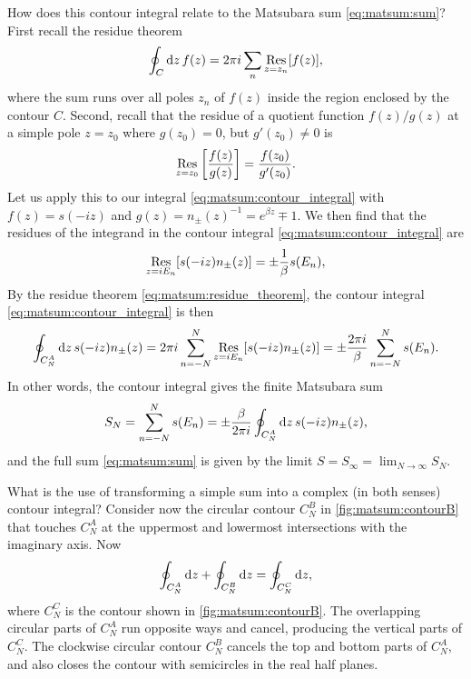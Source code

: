 How does this contour integral relate to the Matsubara sum \eqref{eq:matsum:sum}?
First recall the residue theorem
\begin{equation}
	\oint_C \mathop{}\!\mathrm{d} z \, f(z) = 2 \pi i \sum_n \operatorname*{Res}_{z=z_n} [f(z)] ,
\label{eq:matsum:residue_theorem}
\end{equation}
where the sum runs over all poles $z_n$ of $f(z)$ inside the region enclosed by the contour $C$.
Second, recall that the residue of a quotient function $f(z) / g(z)$ at a simple pole $z = z_0$ where $g(z_0) = 0$, but $g'(z_0) \neq 0$ is 
\begin{equation}
	\operatorname*{Res}_{z=z_0} \left[ \frac{f(z)}{g(z)} \right] = \frac{f(z_0)}{g'(z_0)} .
\label{eq:matsum:residue_quotient}
\end{equation}
Let us apply this to our integral \eqref{eq:matsum:contour_integral} with $f(z) = s(-iz)$ and $g(z) = n_\pm(z)^{-1} = e^{\beta z} \mp 1$.
We then find that the residues of the integrand in the contour integral \eqref{eq:matsum:contour_integral} are
\begin{equation}
	\operatorname*{Res}_{z = i E_n} [s(-iz) n_\pm(z)] = \pm \frac{1}{\beta} s(E_n) ,
\end{equation}
By the residue theorem \eqref{eq:matsum:residue_theorem}, the contour integral \eqref{eq:matsum:contour_integral} is then
\begin{equation}
	\oint_{C_N^A} \mathop{}\!\mathrm{d} z \, s(-iz) n_\pm(z) = 2 \pi i \sum_{n=-N}^N \operatorname*{Res}_{z = i E_n}[s(-i z) n_\pm(z)]
	                                  = \pm \frac{2 \pi i}{\beta} \sum_{n=-N}^N s(E_n) .
\label{eq:matsum:connection_integral_sum}
\end{equation}
In other words, the contour integral gives the finite Matsubara sum
\begin{equation}
	S_N = \sum_{n=-N}^N s(E_n) = \pm \frac{\beta}{2 \pi i} \oint_{C_N^A} \mathop{}\!\mathrm{d} z \, s(-iz) n_\pm(z) ,
\label{eq:matsum:sum_as_contour_integral}
\end{equation}
and the full sum \eqref{eq:matsum:sum} is given by the limit $S = S_\infty = \lim_{N \rightarrow \infty} S_N$.

What is the use of transforming a simple sum into a complex (in both senses) contour integral?
Consider now the circular contour $C_N^B$ in \cref{fig:matsum:contourB} that touches $C_N^A$ at the uppermost and lowermost intersections with the imaginary axis.
Now
\begin{equation}
	\oint_{C_N^A} \mathop{}\!\mathrm{d} z +
	\oint_{C_N^B} \mathop{}\!\mathrm{d} z =
	\oint_{C_N^C} \mathop{}\!\mathrm{d} z ,
\label{eq:matsum:contour_superposition}
\end{equation}
where $C_N^C$ is the contour shown in \cref{fig:matsum:contourB}.
The overlapping circular parts of $C_N^A$ run opposite ways and cancel, producing the vertical parts of $C_N^C$.
The clockwise circular contour $C_N^B$ cancels the top and bottom parts of $C_N^A$, and also closes the contour with semicircles in the real half planes.

